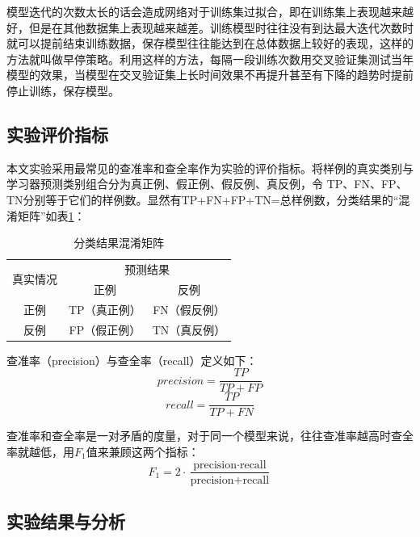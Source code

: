 \documentclass[winfonts,master,oneside,nobackinfo]{njuthesis}
\begin{document}
模型迭代的次数太长的话会造成网络对于训练集过拟合，即在训练集上表现越来越好，但是在其他数据集上表现越来越差。训练模型时往往没有到达最大迭代次数时就可以提前结束训练数据，保存模型往往能达到在总体数据上较好的表现，这样的方法就叫做早停策略。利用这样的方法，每隔一段训练次数用交叉验证集测试当年模型的效果，当模型在交叉验证集上长时间效果不再提升甚至有下降的趋势时提前停止训练，保存模型。

\subsection{实验评价指标}

本文实验采用最常见的查准率和查全率作为实验的评价指标。将样例的真实类别与学习器预测类别组合分为真正例、假正例、假反例、真反例，令
TP、FN、FP、TN分别等于它们的样例数。显然有TP+FN+FP+TN=总样例数，分类结果的“混淆矩阵”如表\ref{mix-matrix}：

\begin{table}[h]
\centering
\begin{tabular}{|c|c|c|}
\hline
\multirow{2}{*}{真实情况} & \multicolumn{2}{c|}{预测结果} \\ \cline{2-3} 
                      & 正例          & 反例          \\ \hline
正例                    & TP（真正例）     & FN（假反例）     \\ \hline
反例                    & FP（假正例）     & TN（真反例）     \\ \hline
\end{tabular}
\caption{分类结果混淆矩阵}
\label{mix-matrix}
\end{table}

查准率（precision）与查全率（recall）定义如下：
\begin{equation}
precision =\frac{T P}{T P+F P}
\end{equation}
\begin{equation}
recall=\frac{T P}{T P+F N}
\end{equation}

查准率和查全率是一对矛盾的度量，对于同一个模型来说，往往查准率越高时查全率就越低，用$F_{1}$值来兼顾这两个指标：
\begin{equation}
F_{1}=2 \cdot \frac{\text {precision} \cdot \text {recall}}{\text {precision}+\text {recall}}
\end{equation}
\subsection{实验结果与分析}
\end{document}

